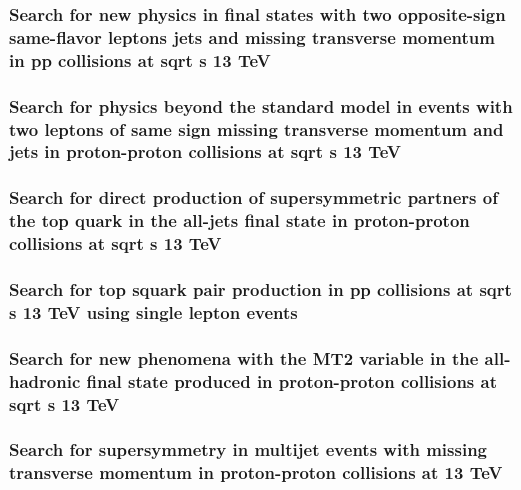 \documentclass[a4paper, 11pt, twoside, openright]{report}
\begin{document}
\subsubsection{Search for new physics in final states with two opposite-sign same-flavor leptons jets and missing transverse momentum in pp collisions at sqrt s 13 TeV}

\subsubsection{Search for physics beyond the standard model in events with two leptons of same sign missing transverse momentum and jets in proton-proton collisions at sqrt s 13 TeV}

\subsubsection{Search for direct production of supersymmetric partners of the top quark in the all-jets final state in proton-proton collisions at sqrt s 13 TeV}

\subsubsection{Search for top squark pair production in pp collisions at sqrt s 13 TeV using single lepton events}

\subsubsection{Search for new phenomena with the MT2 variable in the all-hadronic final state produced in proton-proton collisions at sqrt s 13 TeV}

\subsubsection{Search for supersymmetry in multijet events with missing transverse momentum in proton-proton collisions at 13 TeV}

\end{document}
